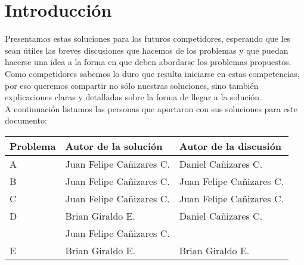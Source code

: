 \chapter{Introducción}

Presentamos estas soluciones para los futuros competidores, esperando que les sean útiles las breves discusiones que hacemos de los problemas y que puedan hacerse una idea a la forma en que deben abordarse los problemas propuestos. \\

Como competidores sabemos lo duro que resulta iniciarse en estas competencias, por eso queremos compartir no sólo nuestras soluciones, sino también explicaciones claras y detalladas sobre la forma de llegar a la solución. \\

A continuación listamos las personas que aportaron con sus soluciones para este documento:

\begin{center}
\begin{tabular}{| l | l | l |} 
\hline
\textbf{Problema} & \textbf{Autor de la solución} & \textbf{Autor de la discusión} \\ \hline
A & Juan Felipe Cañizares C. & Daniel Cañizares C. \\ \hline
B & Juan Felipe Cañizares C. & Juan Felipe Cañizares C. \\ \hline
C & Juan Felipe Cañizares C. & Juan Felipe Cañizares C. \\ \hline
D & Brian Giraldo E.  & Daniel Cañizares C. \\
  & Juan Felipe Cañizares C. & \\ \hline
E & Brian Giraldo E. & Brian Giraldo E. \\ \hline
\end{tabular}
\end{center}